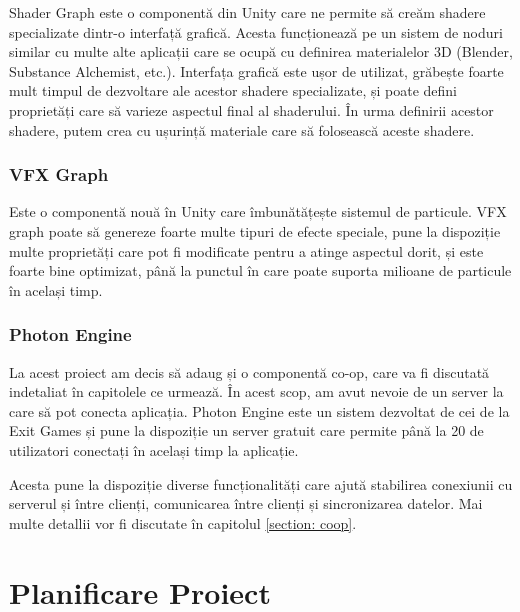 \documentclass[12pt, a4paper]{article}
\begin{document}
	Shader Graph este o componentă din Unity care ne permite să creăm shadere specializate dintr-o interfață grafică. Acesta funcționează pe un sistem de noduri similar cu multe alte aplicații care se ocupă cu definirea materialelor 3D (Blender, Substance Alchemist, etc.). Interfața grafică este ușor de utilizat, grăbește foarte mult timpul de dezvoltare ale acestor shadere specializate, și poate defini proprietăți care să varieze aspectul final al shaderului. În urma definirii acestor shadere, putem crea cu ușurință materiale care să folosească aceste shadere.
	
	
	
	
	
	\subsubsection{VFX Graph}
	
	Este o componentă nouă în Unity care îmbunătățește sistemul de particule. VFX graph poate să genereze foarte multe tipuri de efecte speciale, pune la dispoziție multe proprietăți care pot fi modificate pentru a atinge aspectul dorit, și este foarte bine optimizat, până la punctul în care poate suporta milioane de particule în același timp.
	
	
	
	
	
	\subsubsection{Photon Engine}
	
	La acest proiect am decis să adaug și o componentă co-op, care va fi discutată indetaliat în capitolele ce urmează. În acest scop, am avut nevoie de un server la care să pot conecta aplicația. Photon Engine este un sistem dezvoltat de cei de la Exit Games și pune la dispoziție un server gratuit care permite până la 20 de utilizatori conectați în același timp la aplicație.
	\newline
	
	Acesta pune la dispoziție diverse funcționalități care ajută stabilirea conexiunii cu serverul și între clienți, comunicarea între clienți și sincronizarea datelor. Mai multe detallii vor fi discutate în capitolul \hyperref[section: coop]{\ref{section: coop}}.
	
	
	
	
	
	\section{Planificare Proiect}
\end{document}
